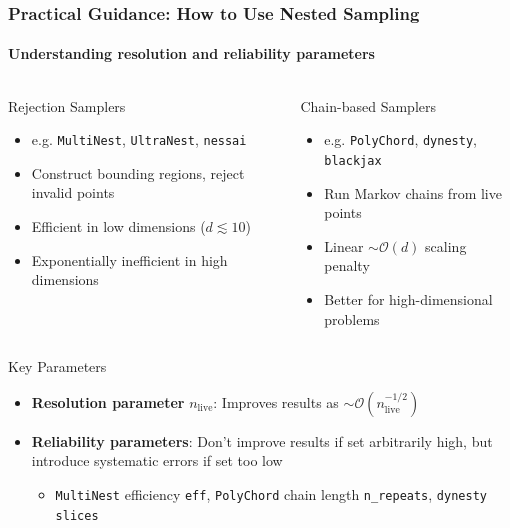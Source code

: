 \documentclass[aspectratio=169]{beamer}
\begin{document}
\begin{frame}
    \frametitle{Practical Guidance: How to Use Nested Sampling}
    \framesubtitle{Understanding resolution and reliability parameters}
    \vspace{-1em}
    \begin{columns}[T]
        \begin{block}{Rejection Samplers}
            \begin{itemize}
                \item e.g. \texttt{MultiNest}, \texttt{UltraNest}, \texttt{nessai}
                \item Construct bounding regions, reject invalid points
                \item Efficient in low dimensions ($d \lesssim 10$)
                \item Exponentially inefficient in high dimensions
            \end{itemize}
        \end{block}
        \begin{block}{Chain-based Samplers}
            \begin{itemize}
                \item e.g. \texttt{PolyChord}, \texttt{dynesty}, \texttt{blackjax}
                \item Run Markov chains from live points
                \item Linear $\sim\mathcal{O}(d)$ scaling penalty
                \item Better for high-dimensional problems
            \end{itemize}
        \end{block}
    \end{columns}
    \vspace{5pt}
    \begin{alertblock}{Key Parameters}
        \begin{itemize}
            \item \textbf{Resolution parameter} $n_{\text{live}}$: Improves results as $\sim\mathcal{O}(n_{\text{live}}^{-1/2})$
            \item \textbf{Reliability parameters}: Don't improve results if set arbitrarily high, but introduce systematic errors if set too low
                \begin{itemize}
                    \item \texttt{MultiNest} efficiency \texttt{eff}, \texttt{PolyChord} chain length \texttt{n\_repeats}, \texttt{dynesty} \texttt{slices}
                \end{itemize}
        \end{itemize}
    \end{alertblock}
\end{frame}
\end{document}
